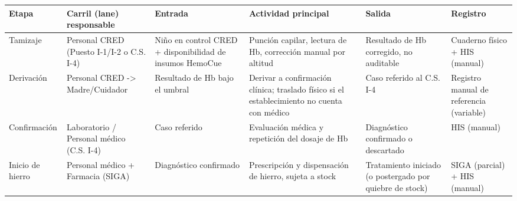 \documentclass[11pt,a4paper]{article}
\begin{document}
{\small
\begin{longtable}[]{@{}
  >{\raggedright\arraybackslash}p{}
  >{\raggedright\arraybackslash}p{}
  >{\raggedright\arraybackslash}p{}
  >{\raggedright\arraybackslash}p{}
  >{\raggedright\arraybackslash}p{}
  >{\raggedright\arraybackslash}p{}@{}}
\toprule\noalign{}
\begin{minipage}[b]{\linewidth}\raggedright
Etapa
\end{minipage} & \begin{minipage}[b]{\linewidth}\raggedright
Carril (lane) responsable
\end{minipage} & \begin{minipage}[b]{\linewidth}\raggedright
Entrada
\end{minipage} & \begin{minipage}[b]{\linewidth}\raggedright
Actividad principal
\end{minipage} & \begin{minipage}[b]{\linewidth}\raggedright
Salida
\end{minipage} & \begin{minipage}[b]{\linewidth}\raggedright
Registro
\end{minipage} \\
\midrule\noalign{}
\endhead
\bottomrule\noalign{}
\endlastfoot
Tamizaje & Personal CRED (Puesto I-1/I-2 o C.S. I-4) & Niño en control CRED + disponibilidad de insumos HemoCue & Punción capilar, lectura de Hb, corrección manual por altitud & Resultado de Hb corregido, no auditable & Cuaderno físico + HIS (manual) \\
Derivación & Personal CRED -\textgreater{} Madre/Cuidador & Resultado de Hb bajo el umbral & Derivar a confirmación clínica; traslado físico si el establecimiento no cuenta con médico & Caso referido al C.S. I-4 & Registro manual de referencia (variable) \\
Confirmación & Laboratorio / Personal médico (C.S. I-4) & Caso referido & Evaluación médica y repetición del dosaje de Hb & Diagnóstico confirmado o descartado & HIS (manual) \\
Inicio de hierro & Personal médico + Farmacia (SIGA) & Diagnóstico confirmado & Prescripción y dispensación de hierro, sujeta a stock & Tratamiento iniciado (o postergado por quiebre de stock) & SIGA (parcial) + HIS (manual) \\

\end{longtable}}
\end{document}
